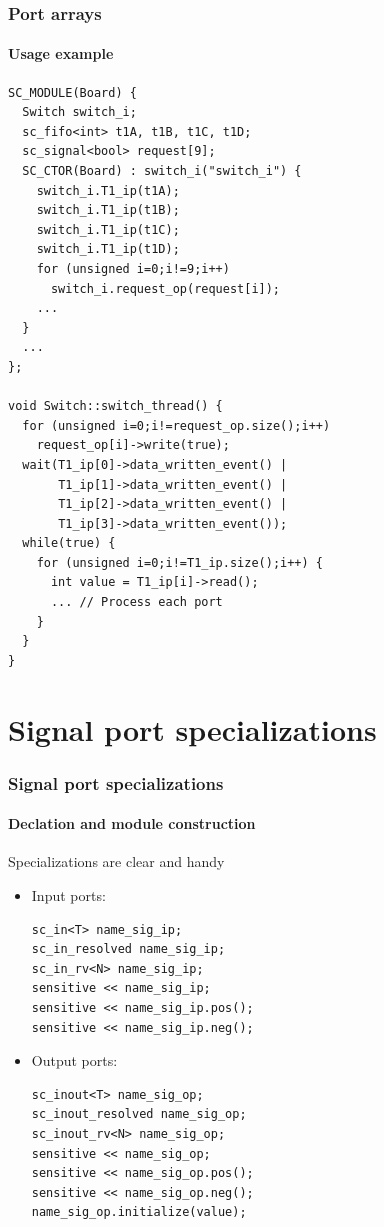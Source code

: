\begin{frame}[fragile]
\frametitle{Port arrays}
\framesubtitle{Usage example}

{\tiny 
\begin{verbatim}
SC_MODULE(Board) {
  Switch switch_i;
  sc_fifo<int> t1A, t1B, t1C, t1D;
  sc_signal<bool> request[9];
  SC_CTOR(Board) : switch_i("switch_i") {
    switch_i.T1_ip(t1A);
    switch_i.T1_ip(t1B);
    switch_i.T1_ip(t1C);
    switch_i.T1_ip(t1D);
    for (unsigned i=0;i!=9;i++)
      switch_i.request_op(request[i]);
    ...
  }
  ...
};

void Switch::switch_thread() {
  for (unsigned i=0;i!=request_op.size();i++) 
    request_op[i]->write(true);
  wait(T1_ip[0]->data_written_event() | 
       T1_ip[1]->data_written_event() |
       T1_ip[2]->data_written_event() | 
       T1_ip[3]->data_written_event());
  while(true) {
    for (unsigned i=0;i!=T1_ip.size();i++) {
      int value = T1_ip[i]->read();
      ... // Process each port 
    }
  }
}
\end{verbatim}
}
\end{frame}

\section{Signal port specializations}

\begin{frame}[fragile]
\frametitle{Signal port specializations}
\framesubtitle{Declation and module construction}
\begin{block}{Specializations are clear and handy}
\vspace{0.5em}
\begin{itemize}
\item Input ports:
{\scriptsize 
\begin{verbatim}
sc_in<T> name_sig_ip;
sc_in_resolved name_sig_ip;
sc_in_rv<N> name_sig_ip;
sensitive << name_sig_ip;
sensitive << name_sig_ip.pos();
sensitive << name_sig_ip.neg();
\end{verbatim}
}
\vspace{0.5em}
\pause
\item Output ports:
{\scriptsize 
\begin{verbatim}
sc_inout<T> name_sig_op;
sc_inout_resolved name_sig_op;
sc_inout_rv<N> name_sig_op;
sensitive << name_sig_op;
sensitive << name_sig_op.pos();
sensitive << name_sig_op.neg();
name_sig_op.initialize(value);
\end{verbatim}
}
\end{itemize}

\end{block}

\end{frame}

